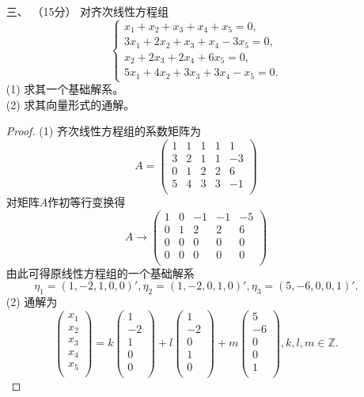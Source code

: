 \begin{enumerate}[1~]
\item[三、]（15分）
对齐次线性方程组\[
\left\{ \begin{array} { l } { x _ { 1 } + x _ { 2 } + x _ { 3 } + x _ { 4 } + x _ { 5 } = 0 ,} \\ { 3 x _ { 1 } + 2 x _ { 2 } + x _ { 3 } + x _ { 4 } - 3 x _ { 5 } = 0 ,} \\ { x _ { 2 } + 2 x _ { 3 } + 2 x _ { 4 } + 6 x _ { 5 } = 0 ,} \\ { 5 x _ { 1 } + 4 x _ { 2 } + 3 x _ { 3 } + 3 x _ { 4 } - x _ { 5 } = 0. } \end{array} \right.
\]
(1) 求其一个基础解系。\\
(2) 求其向量形式的通解。
\begin{proof}
(1) 齐次线性方程组的系数矩阵为\[
A=\left( \begin{matrix}
	1&		1&		1&		1&		1\\
	3&		2&		1&		1&		-3\\
	0&		1&		2&		2&		6\\
	5&		4&		3&		3&		-1\\
\end{matrix} \right) 
\]
对矩阵$A$作初等行变换得\[
A\rightarrow \left( \begin{matrix}
	1&		0&		-1&		-1&		-5\\
	0&		1&		2&		2&		6\\
	0&		0&		0&		0&		0\\
	0&		0&		0&		0&		0\\
\end{matrix} \right) 
\]
由此可得原线性方程组的一个基础解系\[
\eta_1= (1, -2, 1, 0, 0)', \eta_2=(1, -2, 0, 1, 0)', \eta_3=(5, -6, 0, 0, 1)'.
\]
(2) 通解为\[
\left( \begin{array}{c}
	x_1\\
	x_2\\
	x_3\\
	x_4\\
	x_5\\
\end{array} \right) =k\left( \begin{array}{c}
	1\\
	-2\\
	1\\
	0\\
	0\\
\end{array} \right) +l\left( \begin{array}{c}
	1\\
	-2\\
	0\\
	1\\
	0\\
\end{array} \right) +m\left( \begin{array}{c}
	5\\
	-6\\
	0\\
	0\\
	1\\
\end{array} \right) , k, l, m\in \mathbb{Z}.
\]
\end{proof}


\end{enumerate}
